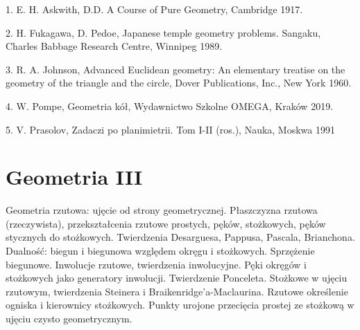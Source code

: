 \documentclass{parchment}
\begin{document}
1. E. H. Askwith, D.D. A Course of Pure Geometry, Cambridge 1917.

2. H. Fukagawa, D. Pedoe, Japanese temple geometry problems. Sangaku, Charles Babbage Research Centre, Winnipeg 1989.

3. R. A. Johnson, Advanced Euclidean geometry: An elementary treatise on the geometry of the triangle and the circle, Dover Publications, Inc., New York 1960.

4. W. Pompe, Geometria kół, Wydawnictwo Szkolne OMEGA, Kraków 2019.

5. V. Prasolov, Zadaczi po planimietrii. Tom I-II (ros.), Nauka, Moskwa 1991

\section{Geometria III}
Geometria rzutowa: ujęcie od strony geometrycznej. Płaszczyzna rzutowa (rzeczywista), przekształcenia rzutowe prostych, pęków, stożkowych, pęków stycznych do stożkowych. Twierdzenia Desarguesa, Pappusa, Pascala, Brianchona. Dualność: biegun i biegunowa względem okręgu i stożkowych. Sprzężenie biegunowe. Inwolucje rzutowe, twierdzenia inwolucyjne. Pęki okręgów i stożkowych jako generatory inwolucji. Twierdzenie Ponceleta. Stożkowe w ujęciu rzutowym, twierdzenia Steinera i Braikenridge'a-Maclaurina. Rzutowe określenie ogniska i kierownicy stożkowych. Punkty urojone przecięcia prostej ze stożkową w ujęciu czysto geometrycznym.

\raggedright
{}
\printindex

\printindex[persons]
\end{document}
